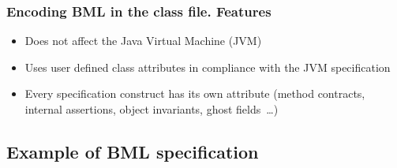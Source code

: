 \documentclass[c]{beamer}
\newcommand{\unsc}{\_}
\begin{document}
\begin{frame}\frametitle{Encoding BML in the class file. Features}
  \begin{itemize} 
              \item Does not affect  the Java Virtual Machine (JVM)
               
     	      \item Uses user defined class attributes 
		 in compliance with the JVM specification
	     \item Every specification construct has its own attribute (method contracts, internal assertions, object invariants, ghost fields~\ldots)
            \end{itemize}  
\end{frame}



\subsection{Example of  BML specification}
\end{document}
